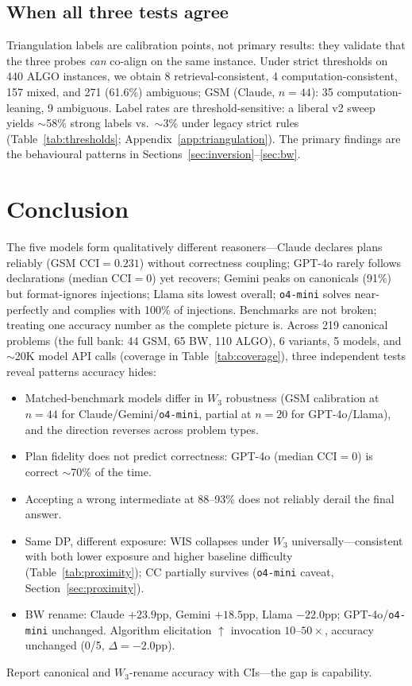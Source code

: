 \documentclass{article}
\newcommand{\omini}{\texttt{o4-mini}}     %
\newcommand{\wthree}{\ensuremath{W_3}}
\begin{document}
\subsection{When all three tests agree}
\label{sec:triangulation}

Triangulation labels are calibration points, not primary results: they
validate that the three probes \emph{can} co-align on the same instance.
Under strict thresholds on 440 ALGO instances, we obtain 8
retrieval-consistent, 4 computation-consistent, 157 mixed, and 271 (61.6\%)
ambiguous; GSM (Claude, $n{=}44$): 35 computation-leaning, 9 ambiguous. Label
rates are threshold-sensitive: a liberal v2 sweep yields $\sim$58\% strong
labels vs.\ $\sim$3\% under legacy strict rules
(Table~\ref{tab:thresholds}; Appendix~\ref{app:triangulation}). The primary
findings are the behavioural patterns in
Sections~\ref{sec:inversion}--\ref{sec:bw}.


\section{Conclusion}
\label{sec:conclusion}

The five models form qualitatively different reasoners---Claude declares
plans reliably (GSM CCI${=}0.231$) without correctness coupling; GPT-4o rarely
follows declarations (median CCI${=}0$) yet recovers; Gemini peaks on
canonicals (91\%) but format-ignores injections; Llama sits lowest overall;
\omini{} solves near-perfectly and complies with 100\% of injections.
Benchmarks are not broken; treating one accuracy number as the complete
picture is. Across 219 canonical problems (the full bank: 44 GSM, 65 BW, 110
ALGO), 6 variants, 5 models, and $\sim$20K model API calls (coverage in
Table~\ref{tab:coverage}), three independent tests reveal patterns accuracy
hides:
\begin{itemize}
  \item Matched-benchmark models differ in \wthree{} robustness (GSM
  calibration at $n{=}44$ for Claude/Gemini/\omini, partial at $n{=}20$ for
  GPT-4o/Llama), and the direction reverses across problem types.
  \item Plan fidelity does not predict correctness: GPT-4o (median CCI${=}0$)
  is correct $\sim$70\% of the time.
  \item Accepting a wrong intermediate at 88--93\% does not reliably derail
  the final answer.
  \item Same DP, different exposure: WIS collapses under \wthree{}
  universally---consistent with both lower exposure and higher baseline
  difficulty (Table~\ref{tab:proximity}); CC partially survives (\omini{}
  caveat, Section~\ref{sec:proximity}).
  \item BW rename: Claude ${+}23.9$pp, Gemini ${+}18.5$pp, Llama ${-}22.0$pp;
  GPT-4o/\omini{} unchanged.
  Algorithm elicitation $\uparrow$ invocation $10$--$50\times$,
accuracy unchanged (0/5, $\Delta{=}{-}2.0$pp).
\end{itemize}
Report canonical and \wthree-rename accuracy with CIs---the gap is capability.
\end{document}
